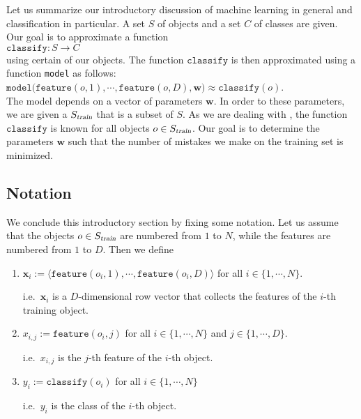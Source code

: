 Let us summarize our introductory discussion of machine learning in general and classification in particular.
A set $S$ of objects and a set $C$ of classes are given.  Our goal is to approximate a function
\\[0.2cm]
\hspace*{1.3cm}
$\mathtt{classify}: S \rightarrow C$
\\[0.2cm]
using certain   of our objects.  The function $\mathtt{classify}$ is then approximated using a function
\texttt{model} as follows:
\\[0.2cm]
\hspace*{1.3cm}
$\mathtt{model}\bigl(\mathtt{feature}(o,1), \cdots, \mathtt{feature}(o,D), \mathbf{w}\bigr) \approx \mathtt{classify}(o)$.
\\[0.2cm]
The model depends on a vector of parameters $\mathbf{w}$.  In order to  these parameters, we are given a 
 $S_\textsl{train}$ that is a subset of $S$.  As we are dealing with ,
 the function 
$\mathtt{classify}$ is known for all objects $o \in S_\textsl{train}$.   Our goal is to determine the parameters $\mathbf{w}$ such that the
number of mistakes we make on the training set is minimized.  

\subsection{Notation}
We conclude this introductory section by fixing some notation.  Let us assume that the objects $o \in S_\textsl{train}$
are numbered 
from $1$ to $N$, while the features are numbered from $1$ to $D$.  Then we define
\begin{enumerate}
\item $\textbf{x}_i := \langle\mathtt{feature}(o_i, 1), \cdots, \mathtt{feature}(o_i, D)\rangle$ \quad for all $i \in \{1, \cdots, N\}$.
  
      i.e.~$\mathbf{x}_i$ is a $D$-dimensional row vector that collects the features of the $i$-th training object.
\item $x_{i,j} := \mathtt{feature}(o_i, j)$ \quad for all $i \in \{1, \cdots, N\}$ and $j \in \{1, \cdots, D\}$.

      i.e.~$x_{i,j}$ is the $j$-th feature of the $i$-th object.
\item $y_i := \mathtt{classify}(o_i)$ \quad for all $i \in \{1, \cdots, N\}$

      i.e.~$y_i$ is the class of the $i$-th object.
\end{enumerate}

